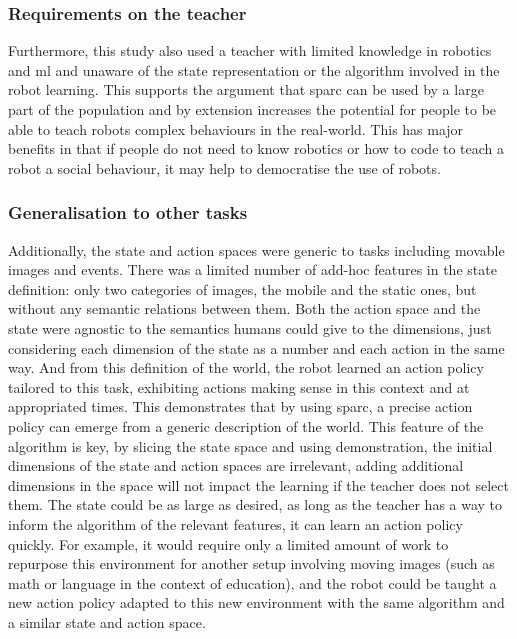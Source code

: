 \subsubsection{Requirements on the teacher}
Furthermore, this study also used a teacher with limited knowledge in robotics and \gls{ml} and unaware of the state representation or the algorithm involved in the robot learning. This supports the argument that \gls{sparc} can be used by a large part of the population and by extension increases the potential for people to be able to teach robots complex behaviours in the real-world. This has major benefits in that if people do not need to know robotics or how to code to teach a robot a social behaviour, it may help to democratise the use of robots. 


\subsubsection{Generalisation to other tasks}
Additionally, the state and action spaces were generic to tasks including movable images and events. There was a limited number of add-hoc features in the state definition: only two categories of images, the mobile and the static ones, but without any semantic relations between them. Both the action space and the state were agnostic to the semantics humans could give to the dimensions, just considering each dimension of the state as a number and each action in the same way. And from this definition of the world, the robot learned an action policy tailored to this task, exhibiting actions making sense in this context and at appropriated times. This demonstrates that by using \gls{sparc}, a precise action policy can emerge from a generic description of the world. This feature of the algorithm is key, by slicing the state space and using demonstration, the initial dimensions of the state and action spaces are irrelevant, adding additional dimensions in the space will not impact the learning if the teacher does not select them. The state could be as large as desired, as long as the teacher has a way to inform the algorithm of the relevant features, it can learn an action policy quickly. For example, it would require only a limited amount of work to repurpose this environment for another setup involving moving images (such as math or language in the context of education), and the robot could be taught a new action policy adapted to this new environment with the same algorithm and a similar state and action space. 


